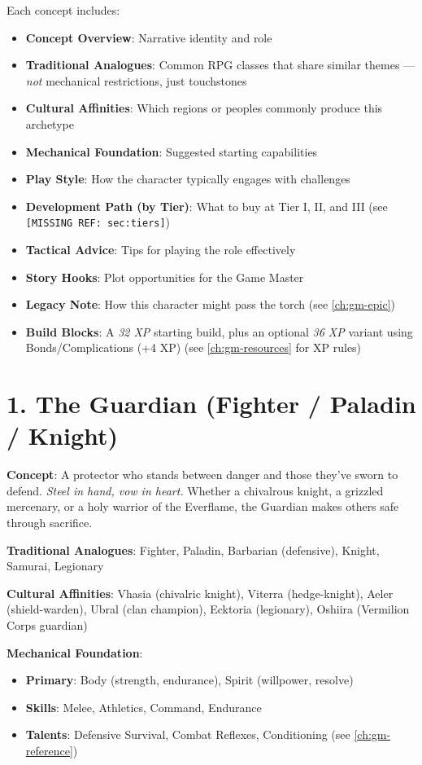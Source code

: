 Each concept includes:
\begin{itemize}
\item \textbf{Concept Overview}: Narrative identity and role
\item \textbf{Traditional Analogues}: Common RPG classes that share similar themes --- \textit{not} mechanical restrictions, just touchstones
\item \textbf{Cultural Affinities}: Which regions or peoples commonly produce this archetype
\item \textbf{Mechanical Foundation}: Suggested starting capabilities
\item \textbf{Play Style}: How the character typically engages with challenges
\item \textbf{Development Path (by Tier)}: What to buy at Tier I, II, and III (see \texttt{[MISSING REF: sec:tiers]})
\item \textbf{Tactical Advice}: Tips for playing the role effectively
\item \textbf{Story Hooks}: Plot opportunities for the Game Master
\item \textbf{Legacy Note}: How this character might pass the torch (see \ref{ch:gm-epic})
\item \textbf{Build Blocks}: A \emph{32 XP} starting build, plus an optional \emph{36 XP} variant using Bonds/Complications (+4 XP) (see \ref{ch:gm-resources} for XP rules)
\end{itemize}

\section{1. The Guardian (Fighter / Paladin / Knight)}
\label{sec:concept-guardian}

\textbf{Concept}: A protector who stands between danger and those they've sworn to defend. \emph{Steel in hand, vow in heart.} Whether a chivalrous knight, a grizzled mercenary, or a holy warrior of the Everflame, the Guardian makes others safe through sacrifice.

\textbf{Traditional Analogues}: Fighter, Paladin, Barbarian (defensive), Knight, Samurai, Legionary

\textbf{Cultural Affinities}: Vhasia (chivalric knight), Viterra (hedge-knight), Aeler (shield-warden), Ubral (clan champion), Ecktoria (legionary), Oshiira (Vermilion Corps guardian)

\textbf{Mechanical Foundation}:
\begin{itemize}
\item \textbf{Primary}: Body (strength, endurance), Spirit (willpower, resolve)
\item \textbf{Skills}: Melee, Athletics, Command, Endurance
\item \textbf{Talents}: Defensive Survival, Combat Reflexes, Conditioning (see \ref{ch:gm-reference})
\end{itemize}

